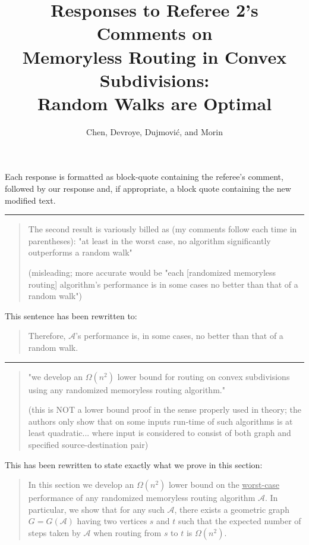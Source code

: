 \documentclass{article}
\title{Responses to Referee 2's Comments on \\
   Memoryless Routing in Convex Subdivisions:\\Random Walks are Optimal}
\author{Chen, Devroye, Dujmovi\'c, and Morin}
\date{}
\begin{document}
\maketitle

Each response is formatted as block-quote containing the referee's comment, followed by our response and, if appropriate, a block quote containing the new modified text.

\hrule

\begin{quote}
The second result is variously billed as (my comments follow each time in parentheses):
"at least in the worst case, no algorithm significantly outperforms a random walk"

(misleading; more accurate would be "each [randomized memoryless routing]
algorithm's performance is in some cases no better than that of a random walk")
\end{quote}

\noindent This sentence has been rewritten to:

\begin{quote}
Therefore, $\mathcal{A}$'s performance is, in some cases, no better than that of a random walk.
\end{quote}

\hrule

\begin{quote}
"we develop an $\Omega(n^2)$ lower bound for routing on convex subdivisions using any
randomized memoryless routing algorithm."

(this is NOT a lower bound proof in the sense properly used in theory; the authors
only show that on some inputs run-time of such algorithms is at least quadratic... where
input is considered to consist of both graph and specified source-destination pair)
\end{quote}

\noindent
This has been rewritten to state exactly what we prove in this section:

\begin{quote}
In this section we develop an $\Omega(n^2)$ lower bound on the \underline{worst-case}
performance of any randomized memoryless routing algorithm $\mathcal{A}$.
In particular, we show that for any such $\mathcal{A}$, there exists a
geometric graph $G=G(\mathcal{A})$ having two vertices $s$ and $t$ such
that the expected number of steps taken by $\mathcal{A}$ when routing
from $s$ to $t$ is $\Omega(n^2)$.
\end{quote}
\end{document}
